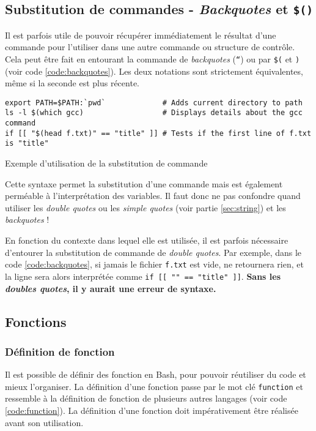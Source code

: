 \subsection{Substitution de commandes - \textit{Backquotes} et \texttt{\$()}} \label{sec:backquotes}


Il est parfois utile de pouvoir récupérer immédiatement le résultat d’une commande pour l’utiliser dans une autre commande ou structure de contrôle. Cela peut être fait en entourant la commande de \textit{backquotes} (\texttt{``}) ou par \texttt{\$(} et \texttt{)} (voir code \ref{code:backquotes}).
Les deux notations sont strictement équivalentes, même si la seconde est plus récente.

\begin{code}
\begin{verbatim}
export PATH=$PATH:`pwd`             # Adds current directory to path
ls -l $(which gcc)                  # Displays details about the gcc command
if [[ "$(head f.txt)" == "title" ]] # Tests if the first line of f.txt is "title"
\end{verbatim}
\vspace{-5mm}
\caption{Exemple d'utilisation de la substitution de commande}
    \label{code:backquotes}
\end{code}

 Cette syntaxe permet la substitution d'une commande mais est également perméable à l'interprétation des variables. Il faut donc ne pas confondre quand utiliser les \textit{double quotes} ou les \textit{simple quotes} (voir partie \ref{sec:string}) et les \textit{backquotes} !

 En fonction du contexte dans lequel elle est utilisée, il est parfois nécessaire d'entourer la substitution de commande de \textit{double quotes}. Par exemple, dans le code \ref{code:backquotes}, si jamais le fichier \texttt{f.txt} est vide,  ne retournera rien, et la ligne sera alors interprétée comme \texttt{if [[ "" == "title" ]]}. \textbf{Sans les \textit{doubles quotes}, il y aurait une erreur de syntaxe.}

\vspace{-1cm}
\subsection{Fonctions} \label{sec:functions}
\vspace{-2mm}

\subsubsection{Définition de fonction}
Il est possible de définir des fonction en Bash, pour pouvoir réutiliser du code et mieux l'organiser. La définition d'une fonction passe par le mot clé \texttt{function} et ressemble à la définition de fonction de plusieurs autres langages (voir code \ref{code:function}). La définition d'une fonction doit impérativement être réalisée avant son utilisation.

